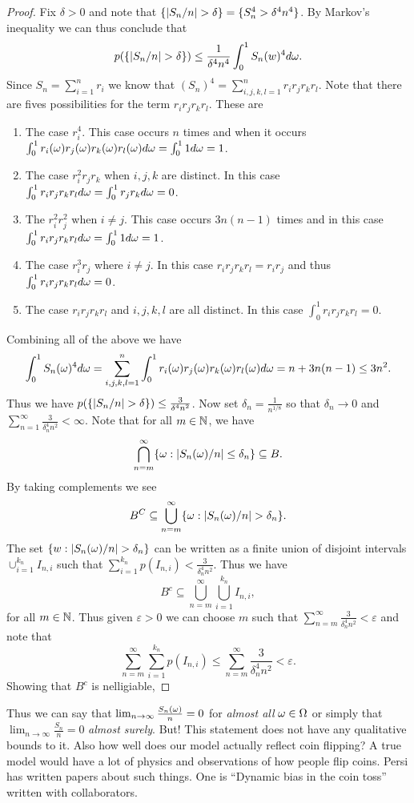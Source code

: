 \begin{proof}
    Fix $\delta > 0$ and note that $\{{\left\lvert S_n/n\right\rvert} > \delta\} = \{S_n^4 > \delta^4n^4\}$. By Markov's inequality we can thus conclude that 
    \[p(\{{\left\lvert S_n/n\right\rvert} > \delta\}) \le \frac{1}{\delta^4n^4}\int_0^1 S_n(w)^4d{\omega}. \]
    Since $S_n = \sum_{i=1}^n r_i$ we know that $(S_n)^4 = \sum\limits_{i,j,k,l = 1}^n r_ir_jr_kr_l$. Note that there are fives possibilities for the term $r_ir_jr_kr_l$. These are
    \begin{enumerate}
        \item The case $r_i^4$. This case occurs $n$ times and when it occurs $\int_0^1 r_i({\omega})r_j({\omega})r_k({\omega})r_l({\omega})d{\omega} = \int_0^1 1d {\omega}=1$.
        \item The case $r_i^2r_jr_k$ when $i,j,k$ are distinct. In this case $\int_0^1 r_ir_jr_kr_ld{\omega} = \int_0^1r_jr_kd{\omega} = 0$.
        \item The $r_i^2r_j^2$ when $i \neq j$. This case occurs $3n(n-1)$ times and in this case $\int_0^1 r_ir_jr_kr_ld{\omega} = \int_0^1 1d{\omega} = 1$.
        \item The case $r_i^3r_j$ where $i\neq j$. In this case $r_ir_jr_kr_l = r_ir_j$ and thus $\int_0^1 r_ir_jr_kr_ld{\omega} = 0$.
        \item The case $r_ir_jr_kr_l$ and $i,j,k,l$ are all distinct. In this case $\int_0^1r_ir_jr_kr_l = 0$.
    \end{enumerate}
    Combining all of the above we have
    \[\int_0^1 S_n({\omega})^4d{\omega} = \sum_{i,j,k,l=1}^n \int_0^1 r_i({\omega})r_j({\omega})r_k({\omega})r_l({\omega})d{\omega} = n+3n(n-1) \le 3n^2. \]
    Thus we have $p(\{{\left\lvert S_n/n\right\rvert} > \delta\}) \le \frac{3}{\delta^4n^2}$. Now set $\delta_n = \frac{1}{n^{1/8}}$ so that $\delta_n \to 0$ and $\sum_{n=1}^\infty \frac{3}{\delta_n^4n^2}< \infty$. Note that for all $m \in {{\mathbb N}}$, we have
    \[\bigcap_{n = m}^\infty\{{\omega} : {\left\lvert S_n({\omega})/n\right\rvert} \le \delta_n \} \subseteq B. \]
    By taking complements we see
    \[B^C \subseteq \bigcup_{n = m}^\infty \{{\omega} : {\left\lvert S_n({\omega})/n\right\rvert} > \delta_n \}. \]
    The set $\{w : {\left\lvert S_n({\omega})/n\right\rvert} > \delta_n \}$ can be written as a finite union of disjoint intervals $\cup_{i=1}^{k_n}I_{n,i}$ such that $\sum_{i=1}^{k_n}p(I_{n,i}) < \frac{3}{\delta_n^4 n^2}$. Thus we have 
    \[ B^c \subseteq \bigcup_{n = m}^\infty \bigcup_{i=1}^{k_n} I_{n,i},\] 
    for all $m \in {{\mathbb N}}$. Thus given $\varepsilon > 0$ we can choose $m$ such that $\sum_{n= m}^\infty \frac{3}{\delta_n^4 n^2} < \varepsilon$ and note that 
    \[\sum_{n = m}^\infty\sum_{i=1}^{k_n}p(I_{n,i}) \le \sum_{n = m}^\infty \frac{3}{\delta_n^4 n^2} < \varepsilon.  \]
    Showing that $B^c$ is nelligiable,
\end{proof}
Thus we can say that $\lim_{n \to \infty} \frac{S_n({\omega})}{n} = 0$ for \emph{almost all} ${\omega} \in {{\Omega}}$ or simply that $\lim_{n \to \infty} \frac{S_n}{n} = 0$ \emph{almost surely}. But! \grumpy 
This statement does not have any qualitative bounds to it. Also how well does our model actually reflect coin flipping? A true model would have a lot of physics and observations of how people flip coins. Persi has written papers about such things. One is ``Dynamic bias in the coin toss'' written with collaborators.


